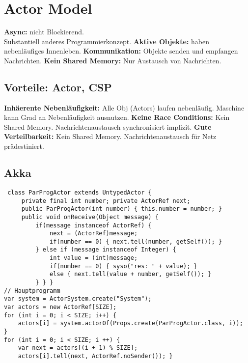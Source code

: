 \section{Actor Model}
\textbf{Async:} nicht Blockierend.\\
Substantiell anderes Programmierkonzept.
\textbf{Aktive Objekte:} haben nebenläufiges Innenleben.
\textbf{Kommunikation:} Objekte senden und empfangen Nachrichten.
\textbf{Kein Shared Memory:} Nur Austausch von Nachrichten.

\subsection{Vorteile: Actor, CSP} 
\textbf{Inhäerente Nebenläufigkeit:} Alle Obj (Actors) laufen nebenläufig.
Maschine kann Grad an Nebenläufigkeit ausnutzen.
\textbf{Keine Race Conditions:} Kein Shared Memory. Nachrichtenaustausch synchronisiert implizit.
\textbf{Gute Verteilbarkeit:} Kein Shared Memory. 
Nachrichtenaustausch für Netz prädestiniert.

\subsection{Akka}
\begin{lstlisting}
 class ParProgActor extends UntypedActor {
     private final int number; private ActorRef next;
     public ParProgActor(int number) { this.number = number; }
     public void onReceive(Object message) {
         if(message instanceof ActorRef) {
             next = (ActorRef)message;
             if(number == 0) { next.tell(number, getSelf()); }
         } else if (message instanceof Integer) {
             int value = (int)message;
             if(number == 0) { syso("res: " + value); }
             else { next.tell(value + number, getSelf()); }
         } } }
// Hauptprogramm
var system = ActorSystem.create("System");
var actors = new ActorRef[SIZE];
for (int i = 0; i < SIZE; i++) {
    actors[i] = system.actorOf(Props.create(ParProgActor.class, i));
}
for (int i = 0; i < SIZE; i ++) {
    var next = actors[(i + 1) % SIZE];
    actors[i].tell(next, ActorRef.noSender()); }
\end{lstlisting}

